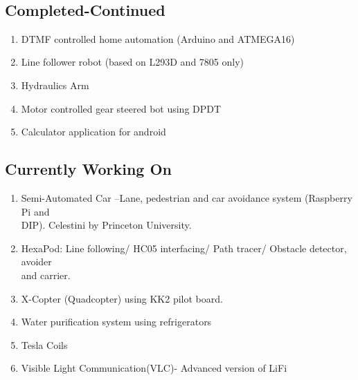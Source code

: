\documentclass[11pt]{article}
\begin{document}
\begin{minipage}{0.20\linewidth}
~\\
\end{minipage}
\begin{minipage}{0.80\linewidth}
\subsection{Completed-Continued}
\begin{enumerate}
\item DTMF controlled home automation (Arduino and ATMEGA16)
\item Line follower robot (based on L293D and 7805 only)
\item Hydraulics Arm
\item Motor controlled gear steered bot using DPDT
\item Calculator application for android
\end{enumerate}

\subsection{Currently Working On}
\begin{enumerate}
\item Semi-Automated Car –Lane, pedestrian and car avoidance system (Raspberry Pi and\\ DIP). Celestini by Princeton University.
\item HexaPod: Line following/ HC05 interfacing/ Path tracer/ Obstacle detector, avoider\\ and carrier.
\item X-Copter (Quadcopter)  using KK2 pilot board.
\item Water purification system using refrigerators
\item Tesla Coils
\item Visible Light Communication(VLC)- Advanced version of LiFi
\end{enumerate}

\end{minipage}
\end{document}
